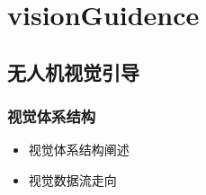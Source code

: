     \chapter{visionGuidence}
    
    \section{无人机视觉引导}
        \subsection{视觉体系结构}
            \begin{itemize}
                \item 视觉体系结构阐述
                \item 视觉数据流走向
            \end{itemize}